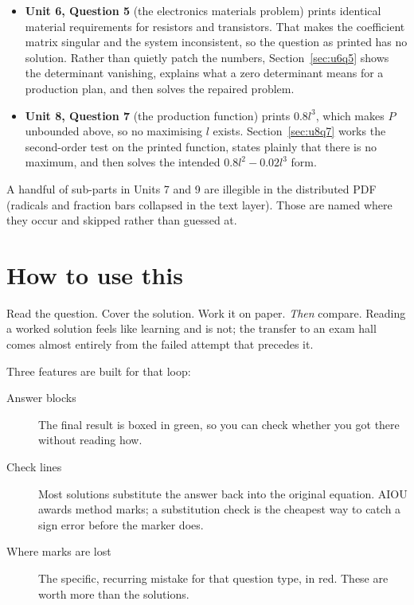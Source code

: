 \begin{itemize}
  \item \textbf{Unit 6, Question 5} (the electronics materials problem) prints
        identical material requirements for resistors and transistors. That makes
        the coefficient matrix singular and the system inconsistent, so the
        question as printed has no solution. Rather than quietly patch the
        numbers, Section~\ref{sec:u6q5} shows the determinant vanishing, explains
        what a zero determinant means for a production plan, and then solves the
        repaired problem.
  \item \textbf{Unit 8, Question 7} (the production function) prints
        $0.8l^{3}$, which makes $P$ unbounded above, so no maximising $l$ exists.
        Section~\ref{sec:u8q7} works the second-order test on the printed
        function, states plainly that there is no maximum, and then solves the
        intended $0.8l^{2}-0.02l^{3}$ form.
\end{itemize}

A handful of sub-parts in Units 7 and 9 are illegible in the distributed PDF
(radicals and fraction bars collapsed in the text layer). Those are named where
they occur and skipped rather than guessed at.

\section*{How to use this}
\label{sec:howtouse}

Read the question. Cover the solution. Work it on paper. \emph{Then} compare.
Reading a worked solution feels like learning and is not; the transfer to an
exam hall comes almost entirely from the failed attempt that precedes it.

Three features are built for that loop:

\begin{description}
  \item[Answer blocks] The final result is boxed in green, so you can check
        whether you got there without reading how.
  \item[Check lines] Most solutions substitute the answer back into the original
        equation. AIOU awards method marks; a substitution check is the cheapest
        way to catch a sign error before the marker does.
  \item[Where marks are lost] The specific, recurring mistake for that question
        type, in red. These are worth more than the solutions.
\end{description}

